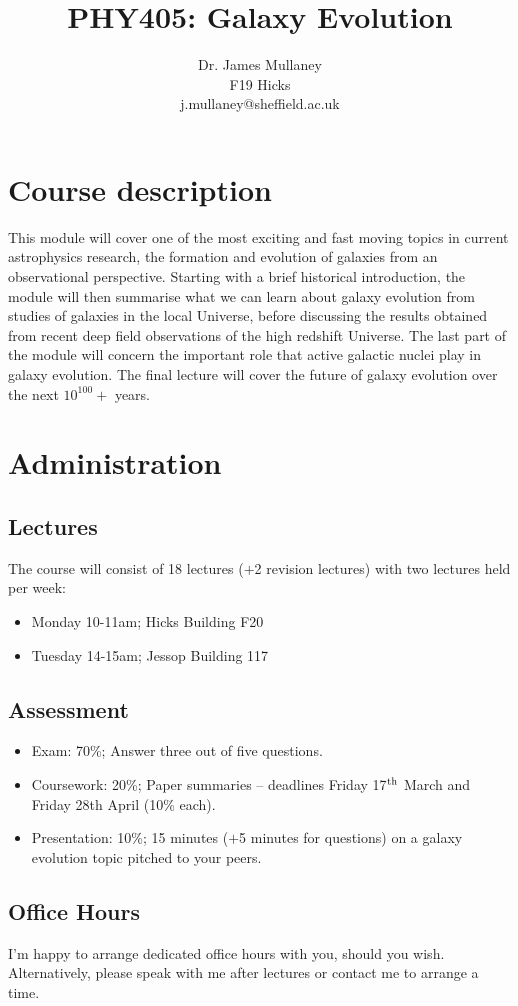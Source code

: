 \documentclass[11pt]{article}
\begin{document}
 
\title{PHY405: Galaxy Evolution}
\author{Dr. James Mullaney\\F19 Hicks\\j.mullaney@sheffield.ac.uk}
\maketitle

\section{Course description}
This module will cover one of the most exciting and fast moving topics
in current astrophysics research, the formation and evolution of
galaxies from an observational perspective. Starting with a brief
historical introduction, the module will then summarise what we can
learn about galaxy evolution from studies of galaxies in the local
Universe, before discussing the results obtained from recent deep
field observations of the high redshift Universe. The last part of
the module will concern the important role that active galactic nuclei
play in galaxy evolution. The final lecture will cover the future of
galaxy evolution over the next $10^{100}+$ years.

\section{Administration}
\subsection{Lectures}
The course will consist of 18 lectures ($+$2 revision lectures) with
two lectures held per week:
\begin{itemize}
\item Monday 10-11am; Hicks Building F20
\item Tuesday 14-15am; Jessop Building 117
\end{itemize}

\subsection{Assessment}
\begin{itemize}
\item Exam: 70\%; Answer three out of five questions.
\item Coursework: 20\%; Paper summaries -- deadlines Friday 17$^{\rm
    th}$ March and Friday 28th April (10\% each).
\item Presentation: 10\%; 15 minutes ($+$5 minutes for questions) on
  a galaxy evolution topic pitched to your peers.
\end{itemize}

\subsection{Office Hours}
I'm happy to arrange dedicated office hours with you, should you
wish. Alternatively, please speak with me after lectures or contact me
to arrange a time.
\end{document}
